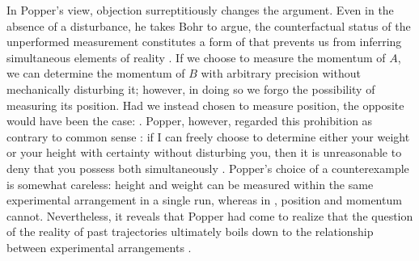 

In Popper's view,  objection surreptitiously changes the argument. Even in the absence of a  disturbance, he takes Bohr to argue, the counterfactual status of the unperformed measurement constitutes a form of  that prevents us from inferring simultaneous elements of reality \citep[445]{Popper1959}. If we choose to measure the momentum of $A$, we can determine the momentum of $B$ with arbitrary precision without mechanically disturbing it; however, in doing so we forgo the possibility of measuring its position. Had we instead chosen to measure position, the opposite would have been the case:  \citep[149]{Popper1982}. Popper, however, regarded this prohibition as contrary to common sense \citep[150]{Popper1982}: if I can freely choose to determine either your weight or your height with certainty without disturbing you, then it is unreasonable to deny that you possess both simultaneously \citep[150]{Popper1982}. Popper's choice of a counterexample is somewhat careless: height and weight can be measured within the same experimental arrangement in a single run, whereas in \qm, position and momentum cannot. Nevertheless, it reveals that Popper had come to realize that the question of the reality of past trajectories ultimately boils down to the relationship between experimental arrangements \citep[54]{Howard2012}.

